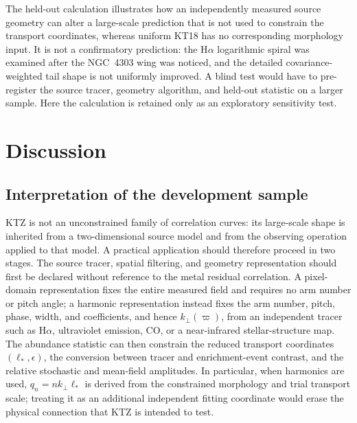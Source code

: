 \documentclass[fleqn,usenatbib]{mnras}
\begin{document}
The held-out calculation illustrates how an independently measured source geometry can alter a large-scale prediction that is not used to constrain the transport coordinates, whereas uniform KT18 has no corresponding morphology input.  It is not a confirmatory prediction: the H$\alpha$ logarithmic spiral was examined after the NGC~4303 wing was noticed, and the detailed covariance-weighted tail shape is not uniformly improved.  A blind test would have to pre-register the source tracer, geometry algorithm, and held-out statistic on a larger sample.  Here the calculation is retained only as an exploratory sensitivity test.


\section{Discussion}
\label{sec:discussion}

\subsection{Interpretation of the development sample}
\label{ssec:discussion_development}

KTZ is not an unconstrained family of correlation curves: its large-scale shape is inherited from a two-dimensional source model and from the observing operation applied to that model.  A practical application should therefore proceed in two stages.  The source tracer, spatial filtering, and geometry representation should first be declared without reference to the metal residual correlation.  A pixel-domain representation fixes the entire measured field and requires no arm number or pitch angle; a harmonic representation instead fixes the arm number, pitch, phase, width, and coefficients, and hence $k_\perp(\varpi)$, from an independent tracer such as H$\alpha$, ultraviolet emission, CO, or a near-infrared stellar-structure map.  The abundance statistic can then constrain the reduced transport coordinates $(\ell_\ast,\epsilon)$, the conversion between tracer and enrichment-event contrast, and the relative stochastic and mean-field amplitudes.  In particular, when harmonics are used, $q_n=nk_\perp\ell_\ast$ is derived from the constrained morphology and trial transport scale; treating it as an additional independent fitting coordinate would erase the physical connection that KTZ is intended to test.
\end{document}
